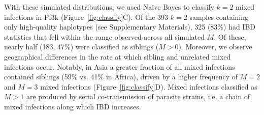 \documentclass[9pt,lineno]{elife}
\begin{document}
With these simulated distributions, we used Naive Bayes to classify $k=2$ mixed infections in Pf3k (Figure~\ref{fig:classify}C).  Of the 393  $k = 2$ samples containing only high-quality haplotypes (see Supplementary Materials), 325 (83\%) had IBD statistics that fell within the range observed across all simulated $M$. Of these, nearly half (183, 47\%) were classified as siblings ($M > 0$).  Moreover, we observe geographical differences in the rate at which sibling and unrelated mixed infections occur. Notably, in Asia a greater fraction of all mixed infections contained siblings (59\% vs. 41\% in Africa), driven by a higher frequency of $M=2$ and $M=3$ mixed infections (Figure~\ref{fig:classify}D).  Mixed infections classified as $M>1$ are produced by serial co-transmission of  parasite strains, i.e. a chain of mixed infections along which IBD increases.
\end{document}
